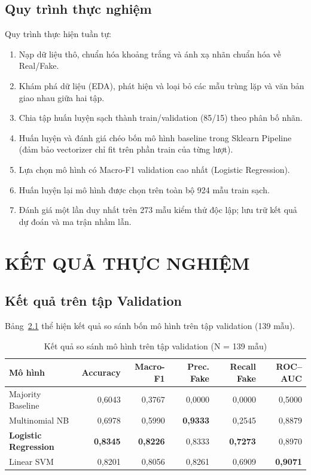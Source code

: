 \documentclass[12pt,a4paper]{report}
\begin{document}
\section{Quy trình thực nghiệm}
Quy trình thực hiện tuần tự:
\begin{enumerate}[leftmargin=24pt]
  \item Nạp dữ liệu thô, chuẩn hóa khoảng trắng và ánh xạ nhãn chuẩn hóa về Real/Fake.
  \item Khám phá dữ liệu (EDA), phát hiện và loại bỏ các mẫu trùng lặp và văn bản giao nhau giữa hai tập.
  \item Chia tập huấn luyện sạch thành train/validation (85/15) theo phân bố nhãn.
  \item Huấn luyện và đánh giá chéo bốn mô hình baseline trong Sklearn Pipeline (đảm bảo vectorizer chỉ fit trên phần train của từng lượt).
  \item Lựa chọn mô hình có Macro-F1 validation cao nhất (Logistic Regression).
  \item Huấn luyện lại mô hình được chọn trên toàn bộ 924 mẫu train sạch.
  \item Đánh giá một lần duy nhất trên 273 mẫu kiểm thử độc lập; lưu trữ kết quả dự đoán và ma trận nhầm lẫn.
\end{enumerate}

\chapter{KẾT QUẢ THỰC NGHIỆM}

\section{Kết quả trên tập Validation}
Bảng~\ref{tab:validation} thể hiện kết quả so sánh bốn mô hình trên tập validation (139 mẫu).

\begin{table}[H]
\centering
\caption{Kết quả so sánh mô hình trên tập validation (N = 139 mẫu)}
\label{tab:validation}
\begin{tabular}{l rrrrr}
\toprule
\textbf{Mô hình} & \textbf{Accuracy} & \textbf{Macro-F1} & \textbf{Prec. Fake} & \textbf{Recall Fake} & \textbf{ROC--AUC} \\
\midrule
Majority Baseline & 0,6043 & 0,3767 & 0,0000 & 0,0000 & 0,5000 \\
Multinomial NB & 0,6978 & 0,5990 & \textbf{0,9333} & 0,2545 & 0,8879 \\
\textbf{Logistic Regression} & \textbf{0,8345} & \textbf{0,8226} & 0,8333 & \textbf{0,7273} & 0,8970 \\
Linear SVM & 0,8201 & 0,8056 & 0,8261 & 0,6909 & \textbf{0,9071} \\
\bottomrule
\end{tabular}
\end{table}
\end{document}
